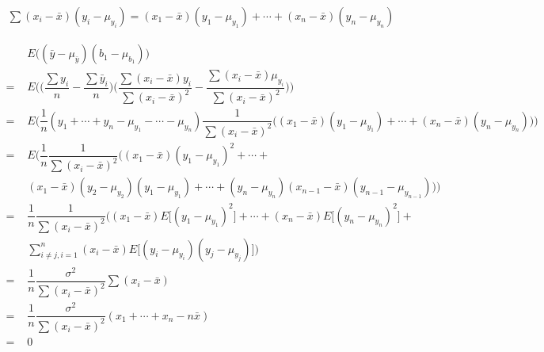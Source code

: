 \begin{align*}
    \sum (x_{i} - \bar{x})(y_{i} - \mu_{y_{i}}) = (x_{1} - \bar{x})(y_{1} - \mu_{y_{1}}) + \cdots + (x_{n} - \bar{x})(y_{n} - \mu_{y_{n}})
\end{align*}

\begin{align*}
    &E\Big((\bar{y} - \mu_{\bar{y}})(b_{1} - \mu_{b_{1}})\Big)\\[2ex]
    = \hspace{4pt} &E\Big(\Big(\dfrac{\sum y_{i}}{n} - \dfrac{\sum \bar{y}_{i}}{n}\Big)\Big(\dfrac{\sum (x_{i} - \bar{x})y_{i}}{\sum (x_{i} - \bar{x})^{2}} - \dfrac{\sum (x_{i} - \bar{x})\mu_{y_{i}}}{\sum (x_{i} - \bar{x})^{2}}\Big)\Big)\\[2ex]
    = \hspace{4pt} &E\Big(\dfrac{1}{n}(y_{1} + \cdots + y_{n} - \mu_{y_{1}} - \cdots - \mu_{y_{n}})\dfrac{1}{\sum (x_{i} - \bar{x})^{2}}\Big((x_{1} - \bar{x})(y_{1} - \mu_{y_{1}}) + \cdots + (x_{n} - \bar{x})(y_{n} - \mu_{y_{n}})\Big)\Big)\\[2ex]
    = \hspace{4pt} &E\Big(\dfrac{1}{n}\dfrac{1}{\sum (x_{i} - \bar{x})^{2}}\Big((x_{1} - \bar{x})(y_{1} - \mu_{y_{1}})^{2} + \cdots + \\[2ex] 
    &(x_{1} - \bar{x})(y_{2} - \mu_{y_{2}})(y_{1} - \mu_{y_{1}}) + \cdots + (y_{n} - \mu_{y_{n}})(x_{n-1} - \bar{x})(y_{n-1} - \mu_{y_{n-1}})\Big)\Big)\\[2ex]
    = \hspace{4pt} &\dfrac{1}{n}\dfrac{1}{\sum (x_{i} - \bar{x})^{2}}\Big((x_{1} - \bar{x})E\Big[(y_{1} - \mu_{y_1})^{2}\Big] + \cdots + (x_{n} - \bar{x})E\Big[(y_{n} - \mu_{y_{n}})^{2}\Big] + \\[2ex]
    &\sum_{i \neq j, i = 1}^{n} (x_{i} - \bar{x})E\Big[(y_{i} - \mu_{y_{i}})(y_{j} - \mu_{y_{j}})\Big]\Big)\\[2ex]
    = \hspace{4pt} &\dfrac{1}{n}\dfrac{\sigma^{2}}{\sum (x_{i} - \bar{x})^{2}}\sum (x_{i} - \bar{x})\\[2ex]
    = \hspace{4pt} &\dfrac{1}{n}\dfrac{\sigma^{2}}{\sum (x_{i} - \bar{x})^{2}}(x_{1} + \cdots + x_{n} - n\bar{x})\\[2ex]
    = \hspace{4pt} &0
\end{align*}